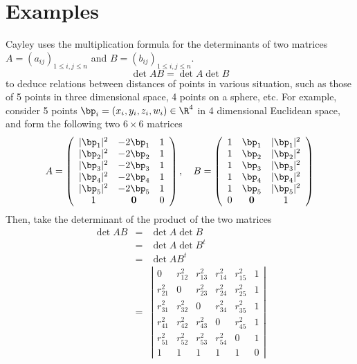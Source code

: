 \documentclass{article}
\begin{document}
\section{Examples}
\label{sec-4}
Cayley uses the multiplication formula for the determinants of two matrices $A=(a_{ij})_{1\le i,j\le n}$ and $B=(b_{ij})_{1\le i,j\le n}$.
\begin{equation}
\label{}
\det{AB} = \det{A}\det{B}
\end{equation}
to deduce relations between distances of points in various situation, such as those of 5 points in three dimensional space, 4 points on a sphere, etc.
 For example, consider 5 points $\bp_i = (x_i,y_i,z_i,w_i) \in \R^4$ in 4 dimensional Euclidean space, and form the following two $6\times 6$ matrices
\begin{equation}
\label{}
A  =   \left(\begin{array}{ccc}|\bp_1|^2 &  -2\bp_1 & 1 \\|\bp_2|^2 & -2\bp_2 & 1 \\|\bp_3|^2 & -2\bp_3 & 1 \\|\bp_4|^2 & -2\bp_4 & 1 \\|\bp_5|^2 & -2\bp_5 &  1 \\1 & \textbf 0 & 0\end{array}\right), \quad
B  =  \left(\begin{array}{ccc}1 &  \bp_1 & |\bp_1|^2 \\1 & \bp_2 & |\bp_2|^2 \\1 & \bp_3 & |\bp_3|^2 \\1 & \bp_4 & |\bp_4|^2 \\1 & \bp_5 & |\bp_5|^2 \\0 & \textbf 0 & 1\end{array}\right)
\end{equation}
Then, take the determinant of the product of the two matrices
\begin{eqnarray}
\det{AB}
 & = & \det{A}\det{B} \nonumber\\
 & = &  \det{A}\det{B^t} \nonumber\\
 & = &  \det{AB^t} \nonumber\\
 & = &  \left|\begin{array}{cccccc}0 & r_{12}^2 & r_{13}^2 & r_{14}^2 & r_{15}^2 & 1 \\r_{21}^2 & 0 & r_{23}^2 & r_{24}^2 & r_{25}^2 & 1 \\r_{31}^2 & r_{32}^2 & 0 & r_{34}^2 & r_{35}^2 & 1 \\r_{41}^2 & r_{42}^2 & r_{43}^2 & 0 & r_{45}^2 & 1 \\r_{51}^2 & r_{52}^2 & r_{53}^2 & r_{54}^2 & 0 & 1 \\1 & 1 & 1 & 1 & 1 & 0  \end{array}\right|
\end{eqnarray}
\end{document}
